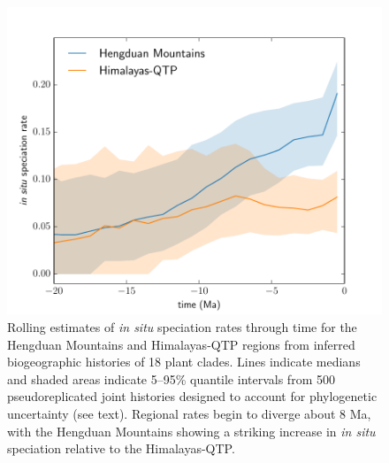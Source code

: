 \documentclass[9pt,twocolumn,twoside,lineno]{pnas-new}
\begin{document}
\begin{figure}
\centering
\includegraphics[width=.99\linewidth]{figures/figure_speciation_rates/figure_speciation_rates.pdf}
\caption{Rolling estimates of \textit{in situ} speciation rates
  through time for the Hengduan Mountains and Himalayas-QTP regions
  from inferred biogeographic histories of 18 plant clades. Lines
  indicate medians and shaded areas indicate 5--95\% quantile
  intervals from 500 pseudoreplicated joint histories designed to
  account for phylogenetic uncertainty (see text). Regional rates
  begin to diverge about 8 Ma, with the Hengduan Mountains showing a
  striking increase in \textit{in situ} speciation relative to the
  Himalayas-QTP.}
\label{fig:speciation}
\end{figure}
\end{document}
